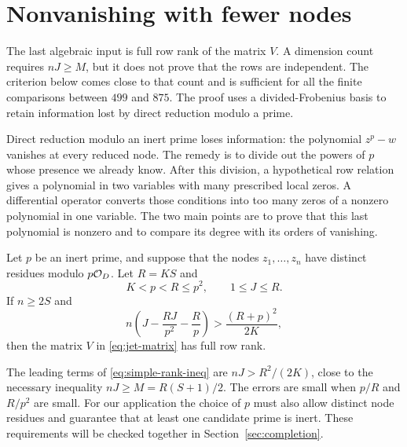 \section{Nonvanishing with fewer nodes}\label{sec:rank}
The last algebraic input is full row rank of the matrix $V$. A dimension count
requires $nJ\geq M$, but it does not prove that the rows are independent.
The criterion below comes close to that count and is sufficient for all the
finite comparisons between $499$ and $875$. The proof uses a divided-Frobenius basis to retain information lost by direct reduction modulo a prime.

Direct reduction modulo an inert prime loses information: the polynomial
$z^p-w$ vanishes at every reduced node. The remedy is to divide out the
powers of $p$ whose presence we already know. After this division, a hypothetical
row relation gives a polynomial in two variables with many prescribed local
zeros. A differential operator converts those conditions into too many zeros
of a nonzero polynomial in one variable. The two main points are to prove that
this last polynomial is nonzero and to compare its degree with its orders of
vanishing.

\begin{theorem}\label{thm:simple-rank}
Let $p$ be an inert prime, and suppose that the nodes $z_1,\ldots,z_n$ have
distinct residues modulo $p\mathcal O_D$. Let $R=KS$ and
\[
 K<p<R\leq p^2,\qquad 1\leq J\leq R.
\]
If $n\geq2S$ and
\begin{equation}\label{eq:simple-rank-ineq}
 n\left(J-\frac{RJ}{p^2}-\frac Rp\right)>
 \frac{(R+p)^2}{2K},
\end{equation}
then the matrix $V$ in \eqref{eq:jet-matrix} has full row rank.
\end{theorem}

The leading terms of \eqref{eq:simple-rank-ineq} are $nJ>R^2/(2K)$, close
to the necessary inequality $nJ\geq M=R(S+1)/2$. The errors are small when
$p/R$ and $R/p^2$ are small. For our application the choice of $p$ must also
allow distinct node residues and guarantee that at least one candidate prime
is inert. These requirements will be checked together in
Section~\ref{sec:completion}.

